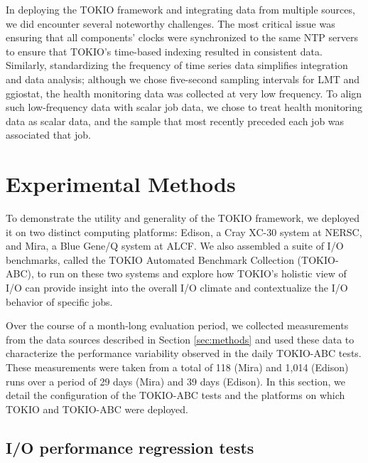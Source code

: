In deploying the TOKIO framework and integrating data from multiple sources, we did encounter several noteworthy challenges.
The most critical issue was ensuring that all components' clocks were synchronized to the same NTP servers to ensure that TOKIO's time-based indexing resulted in consistent data.
Similarly, standardizing the frequency of time series data simplifies integration and data analysis; although we chose five-second sampling intervals for LMT and ggiostat, the health monitoring data was collected at very low frequency.
To align such low-frequency data with scalar job data, we chose to treat health monitoring data as scalar data, and the sample that most recently preceded each job was associated that job.

\section{Experimental Methods} \label{sec:platforms}

To demonstrate the utility and generality of the TOKIO framework, we deployed it on two distinct computing platforms: Edison, a Cray XC-30 system at NERSC, and Mira, a Blue Gene/Q system at ALCF.
We also assembled a suite of I/O benchmarks, called the TOKIO Automated Benchmark Collection (TOKIO-ABC), to run on these two systems and explore how TOKIO's holistic view of I/O can provide insight into the overall I/O climate and contextualize the I/O behavior of specific jobs.

Over the course of a month-long evaluation period, we collected measurements from the data sources described in Section \ref{sec:methods} and used these data to characterize the performance variability observed in the daily TOKIO-ABC tests.
These measurements were taken from a total of 118 (Mira) and 1,014 (Edison) runs over a period of 29 days (Mira) and 39 days (Edison).
In this section, we detail the configuration of the TOKIO-ABC tests and the platforms on which TOKIO and TOKIO-ABC were deployed.

\subsection{I/O performance regression tests} \label{sec:methods/tests}

